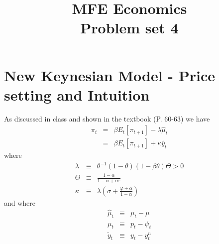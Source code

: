 \documentclass[authoryear,11pt]{elsarticle}
\begin{document}
\begin{frontmatter}
\title{MFE Economics\\Problem set 4}
\end{frontmatter}


\section{New Keynesian Model - Price setting and Intuition}
As discussed in class and shown in the textbook (P. 60-63) we have
\begin{eqnarray}
\pi_{t} 			&=&	\beta E_{t}[ \pi_{t+1} ]	 - \lambda \hat{\mu}_{t}	 \label{eqn:mc_pc} \\
				&=&	\beta E_{t}[ \pi_{t+1} ]	 + \kappa \tilde{y_{t}}	\label{eqn:nkpc}
\end{eqnarray}
where
\begin{eqnarray*}
\lambda 			&\equiv& 	\theta^{-1}(1-\theta)(1-\beta\theta)\Theta > 0 \\
\Theta 			&\equiv& 	\frac{1-\alpha}{1-\alpha + \alpha \varepsilon} \\
\kappa			&\equiv&	\lambda \left(\sigma + \frac{\varphi + \alpha}{1-\alpha}  \right)
\end{eqnarray*}
and where
\begin{eqnarray*}
\hat{\mu}_{t} 	&\equiv&	 \mu_{t} - \mu \\
\mu_{t} 		&\equiv&	 p_{t} - \psi_{t} \\
\tilde{y}_{t}		&\equiv&	y_{t} - y^{n}_{t}
\end{eqnarray*}
\end{document}
